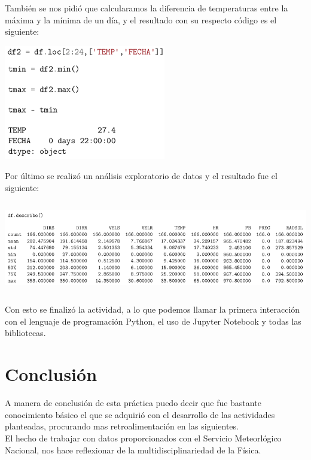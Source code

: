 \documentclass[12pt]{article}
\begin{document}
También se nos pidió que calcularamos la diferencia de temperaturas entre la máxima y la mínima de un día, y el resultado con su respecto código es el siguiente:
\begin{center}
	\includegraphics[height=5cm]{tempe.png}
\end{center}
Por último se realizó un análisis exploratorio de datos y el resultado fue el siguiente:
\begin{center}
	\includegraphics[height=4cm]{df.png}
\end{center}
Con esto se finalizó la actividad, a lo que podemos llamar la primera interacción con el lenguaje de programación Python, el uso de Jupyter Notebook y todas las bibliotecas.

\section{Conclusión}
A manera de conclusión de esta práctica puedo decir que fue bastante conocimiento básico el que se adquirió con el desarrollo de las actividades planteadas, procurando mas retroalimentación en las siguientes.\\

El hecho de trabajar con datos proporcionados con el Servicio Meteorlógico Nacional, nos hace reflexionar de la multidisciplinariedad de la Física.
\end{document}
